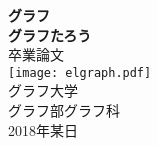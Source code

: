 
\begin{titlepage}
  \centering
  \vspace*{1cm}
  \Huge\textbf{グラフ} \\
  \vspace{2.5cm}
  \Large\textbf{グラフたろう} \\
  \vfill
  卒業論文 \\
  \vspace{.8cm}
  \texttt{[image: elgraph.pdf]} \\
  \Large グラフ大学 \\ グラフ部グラフ科 \\
  2018年某日
\end{titlepage}
